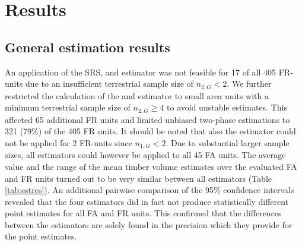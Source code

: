 \section{Results}
\label{sec:Res}

\subsection{General estimation results}
\label{sec:feasest}

An application of the SRS, \psmall{} and \extpsynth{} estimator was not feasible for 17 of all 405 FR-units due to an insufficient terrestrial sample size of $n_{2,G} < 2$. We further restricted the calculation of the \psmall{} and \extpsynth{} estimator to small area units with a minimum terrestrial sample size of $n_{2,G} \geq 4$ to avoid unstable estimates. This affected 65 additional FR units and limited unbiased two-phase estimations to 321 (79\%) of the 405 FR units. It should be noted that also the \psynth{} estimator could not be applied for 2 FR-units since $n_{1,G} < 2$. Due to substantial larger sample sizes, all estimators could however be applied to all 45 FA units. The average value and the range of the mean timber volume estimates over the evaluated FA and FR units turned out to be very similar between all estimators (Table \ref{tab:estres}). An additional pairwise comparison of the 95\% confidence intervals revealed that the four estimators did in fact not produce statistically different point estimates for all FA and FR units. This confirmed that the differences between the estimators are solely found in the precision which they provide for the point estimates.

